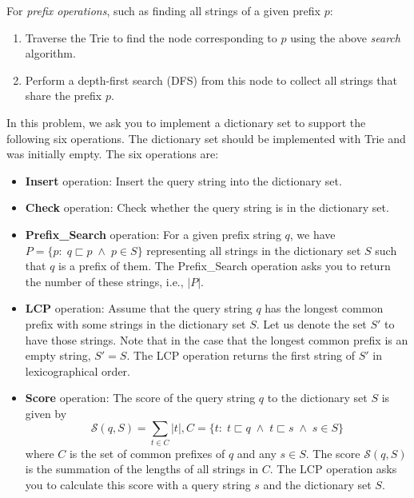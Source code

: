\begin{tcolorbox}[colframe = blue, title={Reference Reading}, colback = white, enhanced, breakable, 
    skin first=enhanced,
    skin middle=enhanced,
    skin last=enhanced,
    before upper={\parindent15pt}]
For \textit{prefix operations}, such as finding all strings of a given prefix $p$:
\begin{enumerate}[label=(\arabic*)]
    \item Traverse the Trie to find the node corresponding to $p$ using the above \textit{search} algorithm.
    \item Perform a depth-first search (DFS) from this node to collect all strings that share the prefix $p$.
\end{enumerate}

\end{tcolorbox}

In this problem, we ask you to implement a dictionary set to support the following six operations. The dictionary set should be implemented with Trie and was initially empty. The six operations are:
\begin{itemize}
    \item \textbf{Insert} operation: Insert the query string into the dictionary set.
    \item \textbf{Check} operation: Check whether the query string is in the dictionary set.
    \item \textbf{Prefix\_Search} operation: 
    For a given prefix string $q$, we have $P=\{p:\; q \sqsubset p \;\wedge\; p \in S\}$ representing all strings in the dictionary set $S$ such that $q$ is a prefix of them. The Prefix\_Search operation asks you to return the number of these strings, i.e., $|P|$.
    
    \item \textbf{LCP} operation: 
    Assume that the query string $q$ has the longest common prefix with some strings in the dictionary set $S$. Let us denote the set $S'$ to have those strings. Note that in the case that the longest common prefix is an empty string, $S'=S$. The LCP operation returns the first string of $S'$ in lexicographical order.
    \item \textbf{Score} operation:
    The score of the query string $q$ to the dictionary set $S$ is given by 
    \begin{equation}
        \mathcal{S}(q,S)= \sum_{t\in C} |t|, C = \{t: \; t \sqsubset q \;\wedge\; t \sqsubset s \;\wedge\; s \in S\}
    \end{equation}
    where $C$ is the set of common prefixes of $q$ and any $s \in S$. The score $\mathcal{S}(q,S)$ is the summation of the lengths of all strings in $C$. The LCP operation asks you to calculate this score with a query string $s$ and the dictionary set $S$.
    

\end{itemize}
